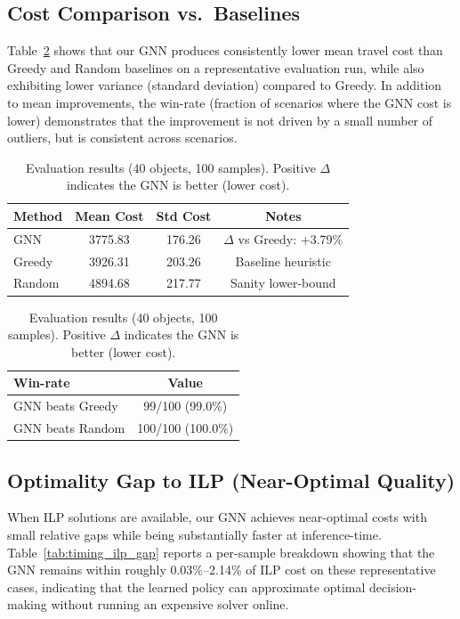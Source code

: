 \documentclass[conference]{IEEEtran}
\begin{document}
\subsection{Cost Comparison vs.\ Baselines}
Table~\ref{tab:results_40obj_100} shows that our GNN produces consistently lower mean travel cost than Greedy and Random baselines on a representative evaluation run, while also exhibiting lower variance (standard deviation) compared to Greedy. 
In addition to mean improvements, the win-rate (fraction of scenarios where the GNN cost is lower) demonstrates that the improvement is not driven by a small number of outliers, but is consistent across scenarios.

\begin{table}[htbp]
\caption{Evaluation results (40 objects, 100 samples). Positive $\Delta$ indicates the GNN is better (lower cost).}
\label{tab:results_40obj_100}
\centering
\begin{tabular}{|l|c|c|c|}
\hline
\textbf{Method} & \textbf{Mean Cost} & \textbf{Std Cost} & \textbf{Notes} \\
\hline
GNN & 3775.83 & 176.26 & $\Delta$ vs Greedy: +3.79\% \\
Greedy & 3926.31 & 203.26 & Baseline heuristic \\
Random & 4894.68 & 217.77 & Sanity lower-bound \\
\hline
\end{tabular}
\vspace{2mm}

\begin{tabular}{|l|c|}
\hline
\textbf{Win-rate} & \textbf{Value} \\
\hline
GNN beats Greedy & 99/100 (99.0\%) \\
GNN beats Random & 100/100 (100.0\%) \\
\hline
\end{tabular}
\end{table}

\subsection{Optimality Gap to ILP (Near-Optimal Quality)}
When ILP solutions are available, our GNN achieves near-optimal costs with small relative gaps while being substantially faster at inference-time.
Table~\ref{tab:timing_ilp_gap} reports a per-sample breakdown showing that the GNN remains within roughly 0.03\%--2.14\% of ILP cost on these representative cases, indicating that the learned policy can approximate optimal decision-making without running an expensive solver online.
\end{document}
